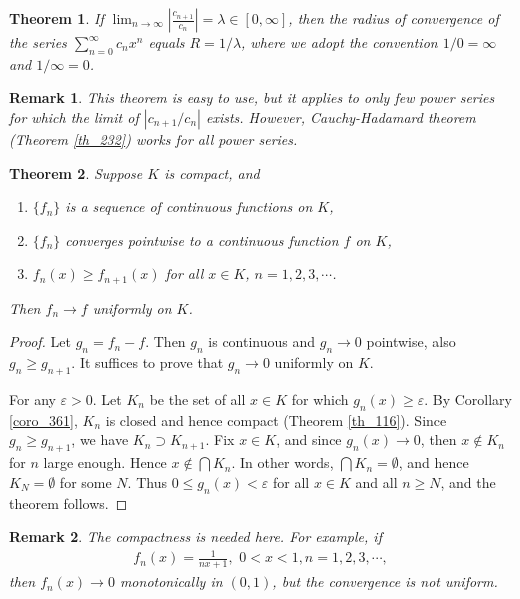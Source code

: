 \documentclass[11pt]{book}
\newtheorem{theorem}{Theorem}[chapter]
\newtheorem{remark}{Remark}[chapter]
\theoremstyle{definition}
\numberwithin{equation}{chapter}
\begin{document}
\begin{theorem}
If $\lim_{n\to\infty} \displaystyle \left|\frac{c_{n+1}}{c_n}\right| = \lambda \in [0,\infty]$, then the radius of convergence of the series $\sum^\infty_{n=0} c_n x^n$ equals $R = 1/\lambda$, where we adopt the convention $1/0 = \infty$ and $1/\infty = 0$.
\end{theorem}

\medskip

\begin{remark}
This theorem is easy to use, but it applies to only few power series for which the limit of $\left|c_{n+1}/c_n\right|$ exists. However, Cauchy-Hadamard theorem (Theorem \ref{th_232}) works for {\em all} power series.
\end{remark}

\medskip

\begin{theorem}
Suppose $K$ is compact, and
\begin{enumerate}[label=(\alph*)]
    \item $\{f_n\}$ is a sequence of continuous functions on $K$,
    
    \item $\{f_n\}$ converges pointwise to a continuous function $f$ on $K$,
    
    \item $f_n(x) \geq f_{n+1}(x)$ for all $x \in K$, $n = 1,2,3,\cdots$.
\end{enumerate}
Then $f_n \to f$ uniformly on $K$.
\end{theorem}
\begin{proof}
Let $g_n = f_n - f$. Then $g_n$ is continuous and $g_n \to 0$ pointwise, also $g_n \geq g_{n+1}$. It suffices to prove that $g_n \to 0$ uniformly on $K$.

For any $\varepsilon > 0$. Let $K_n$ be the set of all $x \in K$ for which $g_n(x) \geq \varepsilon$. By Corollary \ref{coro_361}, $K_n$ is closed and hence compact (Theorem \ref{th_116}). Since $g_n \geq g_{n+1}$, we have $K_n \supset K_{n+1}$. Fix $x \in K$, and since $g_n(x) \to 0$, then $x \notin K_n$ for $n$ large enough. Hence $x \notin \bigcap K_n$. In other words, $\bigcap K_n = \emptyset$, and hence $K_N = \emptyset$ for some $N$. Thus $0 \leq g_n(x) < \varepsilon$ for all $x \in K$ and all $n \geq N$, and the theorem follows. 
\end{proof}

\medskip

\begin{remark}
The compactness is needed here. For example, if
\begin{align*}
    f_n(x) = \frac{1}{nx + 1}, \,\, 0 < x < 1, n = 1,2,3,\cdots,
\end{align*}
then $f_n(x) \to 0$ monotonically in $(0,1)$, but the convergence is not uniform.
\end{remark}
\end{document}
